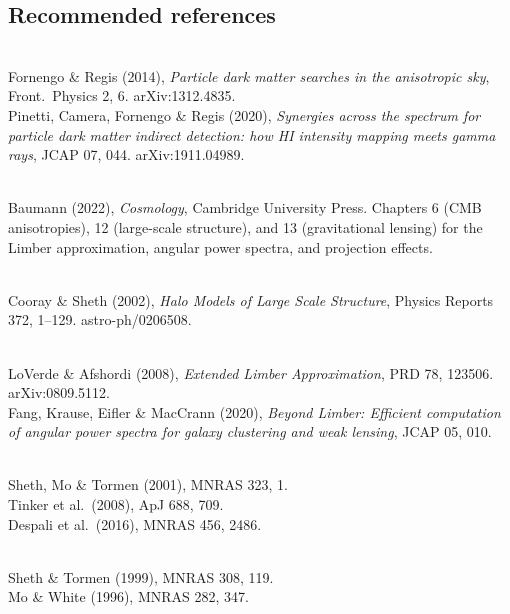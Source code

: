 \documentclass[10pt,a4paper]{article}
\begin{document}
\subsection{Recommended references}

\begin{description}[style=nextline, labelwidth=4cm]
    \item[Foundational papers:] ~\\
    Fornengo \& Regis (2014), \textit{Particle dark matter searches in the anisotropic sky}, Front.\ Physics 2, 6. arXiv:1312.4835. \\
    Pinetti, Camera, Fornengo \& Regis (2020), \textit{Synergies across the spectrum for particle dark matter indirect detection: how HI intensity mapping meets gamma rays}, JCAP 07, 044. arXiv:1911.04989.

    \item[Cosmological foundations:] ~\\
    Baumann (2022), \textit{Cosmology}, Cambridge University Press. Chapters 6 (CMB anisotropies), 12 (large-scale structure), and 13 (gravitational lensing) for the Limber approximation, angular power spectra, and projection effects.

    \item[Halo model review:] ~\\
    Cooray \& Sheth (2002), \textit{Halo Models of Large Scale Structure}, Physics Reports 372, 1--129. astro-ph/0206508.

    \item[Limber approximation corrections:] ~\\
    LoVerde \& Afshordi (2008), \textit{Extended Limber Approximation}, PRD 78, 123506. arXiv:0809.5112. \\
    Fang, Krause, Eifler \& MacCrann (2020), \textit{Beyond Limber: Efficient computation of angular power spectra for galaxy clustering and weak lensing}, JCAP 05, 010.

    \item[Halo mass function:] ~\\
    Sheth, Mo \& Tormen (2001), MNRAS 323, 1. \\
    Tinker et al.\ (2008), ApJ 688, 709. \\
    Despali et al.\ (2016), MNRAS 456, 2486.

    \item[Halo bias:] ~\\
    Sheth \& Tormen (1999), MNRAS 308, 119. \\
    Mo \& White (1996), MNRAS 282, 347.


\end{description}
\end{document}
